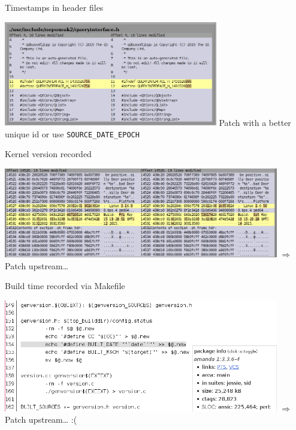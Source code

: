 \documentclass[14pt]{beamer}
\begin{document}

\begin{frame}{Timestamps in header files}
 \begin{center}
  \includegraphics[width=0.7\textwidth]{images/examples/timestamps_in_header_files.png}
  \vfill
  Patch with a better unique id or use \texttt{SOURCE\_DATE\_EPOCH}
 \end{center}
\end{frame}

\begin{frame}{Kernel version recorded}
 \begin{center}
  \includegraphics[width=0.9\textwidth]{images/examples/embedded_kernel_version.png}
  \vfill
  $\Longrightarrow$ Patch upstream\ldots{}
 \end{center}
\end{frame}

\begin{frame}{Build time recorded via Makefile}
 \begin{center}
  \includegraphics[width=0.9\textwidth]{images/examples/build_date_in_makefile.png}
  \vfill
  $\Longrightarrow$ Patch upstream\ldots{} :(
 \end{center}
\end{frame}
\end{document}
